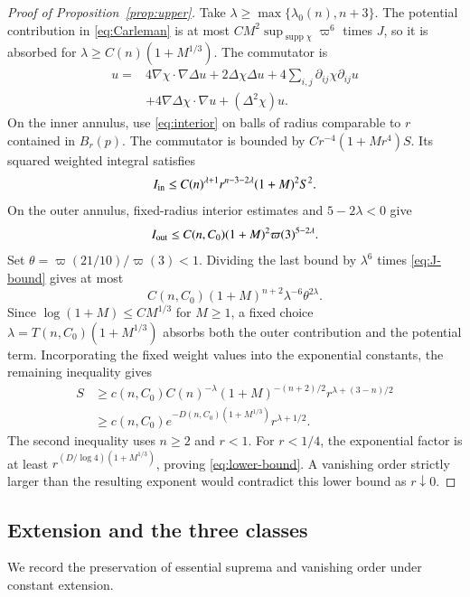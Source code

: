 \documentclass[11pt,twoside,leqno]{article}
\numberwithin{equation}{section}
\theoremstyle{definition}
\theoremstyle{remark}
\newcommand{\supp}{\operatorname{supp}}
\begin{document}
\begin{proof}[Proof of Proposition~\ref{prop:upper}]
Take $\lambda\ge\max\{\lambda_0(n),n+3\}$.
The potential contribution in \eqref{eq:Carleman} is at most
$CM^2\sup_{\supp\chi}\varpi^6$ times $J$, so it is absorbed for
$\lambda\ge C(n)(1+M^{1/3})$. The commutator is
\begin{align*}
 [\Delta^2,\chi]u={}&4\nabla\chi\cdot\nabla\Delta u
 +2\Delta\chi\Delta u+4\sum_{i,j}\partial_{ij}\chi\partial_{ij}u\\
 &+4\nabla\Delta\chi\cdot\nabla u+(\Delta^2\chi)u.
\end{align*}
On the inner annulus, use \eqref{eq:interior} on balls of radius
comparable to $r$ contained in $B_r(p)$. The commutator is bounded by
$Cr^{-4}(1+Mr^4)S$. Its squared weighted integral satisfies
\[
 I_{\rm in}\le C(n)^{\lambda+1}
 r^{n-3-2\lambda}(1+M)^2S^2.
\]
On the outer annulus, fixed-radius interior estimates and
$5-2\lambda<0$ give
\[
 I_{\rm out}\le C(n,C_0)(1+M)^2\varpi(3)^{5-2\lambda}.
\]
Set $\theta=\varpi(21/10)/\varpi(3)<1$. Dividing the last bound
by $\lambda^6$ times \eqref{eq:J-bound} gives at most
\[
 C(n,C_0)(1+M)^{n+2}\lambda^{-6}\theta^{2\lambda}.
\]
Since $\log(1+M)\le C M^{1/3}$ for $M\ge1$, a fixed choice
$\lambda=T(n,C_0)(1+M^{1/3})$ absorbs both the outer contribution
and the potential term. Incorporating the fixed weight values into
the exponential constants, the remaining inequality gives
\begin{align*}
 S&\ge c(n,C_0)C(n)^{-\lambda}(1+M)^{-(n+2)/2}
                  r^{\lambda+(3-n)/2}\\
  &\ge c(n,C_0)e^{-D(n,C_0)(1+M^{1/3})}r^{\lambda+1/2}.
\end{align*}
The second inequality uses $n\ge2$ and $r<1$.
For $r<1/4$, the exponential factor is at least
$r^{(D/\log4)(1+M^{1/3})}$, proving \eqref{eq:lower-bound}.
A vanishing order strictly larger than the resulting exponent would
contradict this lower bound as $r\downarrow0$.
\end{proof}

\subsection{Extension and the three classes}

We record the preservation of essential suprema and vanishing order
under constant extension.
\end{document}
